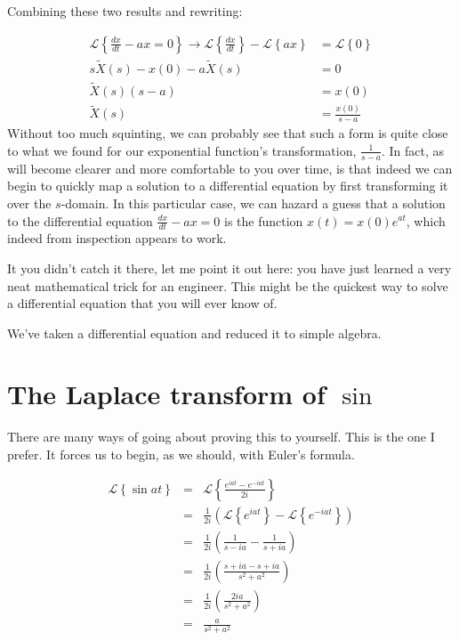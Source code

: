 \documentclass[11pt]{book}
\begin{document}
Combining these two results and rewriting:

\begin{align}
	\mathcal{L}\left\{\frac{dx}{dt} - ax = 0\right\} \rightarrow \mathcal{L}\left\{\frac{dx}{dt}\right\} - \mathcal{L}\left\{ax\right\} &= \mathcal{L}\left\{0\right\} \\
	s\tilde{X}(s) - x(0) - a\tilde{X}(s) &= 0 \\
	\tilde{X}(s)\left(s - a\right) &= x(0) \\
	\tilde{X}(s) &= \frac{x(0)}{s - a}
\end{align}
Without too much squinting, we can probably see that such a form is quite close to what we found for our exponential function's transformation, $\frac{1}{s - a}$. In fact, as will become clearer and more comfortable to you over time, is that indeed we can begin to quickly map a solution to a differential equation by first transforming it over the $s$-domain. In this particular case, we can hazard a guess that a solution to the differential equation $\frac{dx}{dt} -ax = 0$ is the function $x(t) = x(0)e^{at}$, which indeed from inspection appears to work.

It you didn't catch it there, let me point it out here: you have just learned a very neat mathematical trick for an engineer. This might be the quickest way to solve a differential equation that you will ever know of.

We've taken a differential equation and reduced it to simple algebra.

\section{The Laplace transform of $\sin$}
There are many ways of going about proving this to yourself. This is the one I prefer. It forces us to begin, as we should, with Euler's formula.

\begin{eqnarray}
	\mathcal L\left\{ {\sin at}\right\} &=& \mathcal L\left\{ {\frac {e^{iat}-e^{-iat} } {2i} }\right\} \\
	&=& \frac 1 {2i} \left( {\mathcal L\left\{ { e^{iat} }  \right\} - \mathcal L \left\{ { e^{-iat} } \right\} } \right) \\
	&=& \frac 1 {2i} \left( {\frac 1 {s-ia}-\frac 1 {s+ia} } \right) \\
	&=& \frac 1 {2i} \left( {\frac {s+ia-s+ia} {s^2+a^2} } \right) \\
	&=& \frac 1 {2i} \left({\frac{2ia}{s^2+a^2} }\right) \\
	&=& \frac a {s^2+a^2}
\end{eqnarray}
\end{document}
